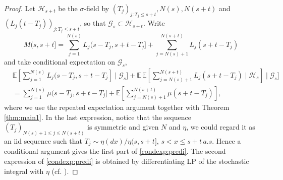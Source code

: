 \documentclass[11pt,leqno%
]{amsart}
\newcommand{\E }{{\mathbb E}}
\newcommand{\1}{{\mathbf 1}}
\begin{document}
\begin{proof}
Let $\mathcal H_{s+t}$ be the $\sigma$-field by $(T_j)_{j:T_j\le
 s+t},N(s),N(s+t)$ and $(L_j(t-T_j))_{j:T_j\le s+t}$, so that $\mathcal G_s
 \subset \mathcal H_{s+t}$. Write 
 \[
  M(s,s+t] = \sum_{j=1}^{N(s)} L_j (s-T_j,s+t-T_j] +
 \sum_{j=N(s)+1}^{N(s+t)}L_j (s+t-T_j)
 \]
 and take conditional expectation on $\mathcal G_s$,
 \begin{align*}
  & \E [\sum_{j=1}^{N(s)}L_j(s-T_j,s+t-T_j] \mid \mathcal G_s] + \E\,\E
  [\sum_{j=N(s)+1}^{N(s+t)} L_j(s+t-T_j)\mid \mathcal H_s] \mid \mathcal
  G_s ] \\
 &= \sum_{j=1}^{N(s)} \mu(s-T_j,s+t-T_j]+ \E [\sum_{j=N(s)+1}^{N(s+t)} \mu(s+t-T_j)], 
 \end{align*}
 where we use the repeated expectation \cite[Theorem 6.1 (vii)]{kallenberg:2002} argument together with Theorem
 \ref{thm:main1}. In the last expression, notice that the sequence $(T_j)_{N(s)+1
 \le j\le N(s+t)}$ is symmetric and given $N$ and $\eta$, we could
 regard it as an iid sequence such that $T_j\sim
 \eta(dx)/\eta(s,s+t],\,s<x\le s+t\, a.s.$ Hence a conditional
 argument gives the first part of \eqref{condexp:predi}. The second
 expression of \eqref{condexp:predi} is obtained by differentiating LP
 of the stochastic integral with $\eta$ (cf. \cite[Proposition 2.6]{rajput:rosinski:1989}). 


\end{proof}
\end{document}
